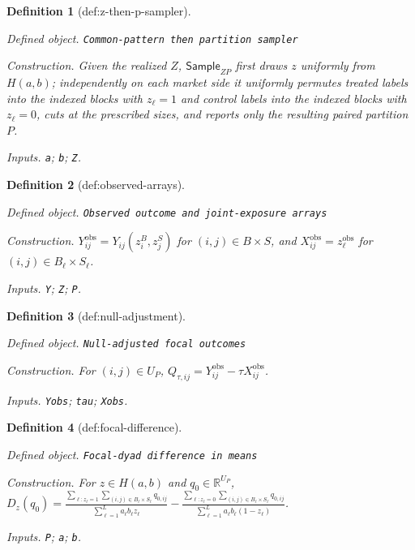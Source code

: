 \documentclass{article}
\newtheorem{definition}{Definition}
\begin{document}
\begin{definition}[def:z-then-p-sampler]\label{def:z-then-p-sampler}
\par\smallskip\noindent\emph{Defined object.} \texttt{Common-\allowbreak{}pattern then partition sampler}
\par\smallskip\noindent\emph{Construction.} Given the realized \(Z\), \(\mathsf{Sample}_{ZP}\) first draws \(z\) uniformly from \(H(a,b)\); independently on each market side it uniformly permutes treated labels into the indexed blocks with \(z_\ell=1\) and control labels into the indexed blocks with \(z_\ell=0\), cuts at the prescribed sizes, and reports only the resulting paired partition \(P\).
\par\smallskip\noindent\emph{Inputs.} \texttt{a}; \texttt{b}; \texttt{Z}.
\end{definition}

\begin{definition}[def:observed-arrays]\label{def:observed-arrays}
\par\smallskip\noindent\emph{Defined object.} \texttt{Observed outcome and joint-\allowbreak{}exposure arrays}
\par\smallskip\noindent\emph{Construction.} \(Y_{ij}^{\mathrm{obs}}=Y_{ij}(z_i^B,z_j^S)\) for \((i,j)\in B\times S\), and \(X_{ij}^{\mathrm{obs}}=z_\ell^{\mathrm{obs}}\) for \((i,j)\in B_\ell\times S_\ell\).
\par\smallskip\noindent\emph{Inputs.} \texttt{Y}; \texttt{Z}; \texttt{P}.
\end{definition}

\begin{definition}[def:null-adjustment]\label{def:null-adjustment}
\par\smallskip\noindent\emph{Defined object.} \texttt{Null-\allowbreak{}adjusted focal outcomes}
\par\smallskip\noindent\emph{Construction.} For \((i,j)\in U_P\), \(Q_{\tau,ij}=Y_{ij}^{\mathrm{obs}}-\tau X_{ij}^{\mathrm{obs}}\).
\par\smallskip\noindent\emph{Inputs.} \texttt{Yobs}; \texttt{tau}; \texttt{Xobs}.
\end{definition}

\begin{definition}[def:focal-difference]\label{def:focal-difference}
\par\smallskip\noindent\emph{Defined object.} \texttt{Focal-\allowbreak{}dyad difference in means}
\par\smallskip\noindent\emph{Construction.} For \(z\in H(a,b)\) and \(q_0\in\mathbb R^{U_P}\), \(D_z(q_0)=\frac{\sum_{\ell:z_\ell=1}\sum_{(i,j)\in B_\ell\times S_\ell}q_{0,ij}}{\sum_{\ell=1}^{L}a_\ell b_\ell z_\ell}-\frac{\sum_{\ell:z_\ell=0}\sum_{(i,j)\in B_\ell\times S_\ell}q_{0,ij}}{\sum_{\ell=1}^{L}a_\ell b_\ell(1-z_\ell)}\).
\par\smallskip\noindent\emph{Inputs.} \texttt{P}; \texttt{a}; \texttt{b}.
\end{definition}
\end{document}
